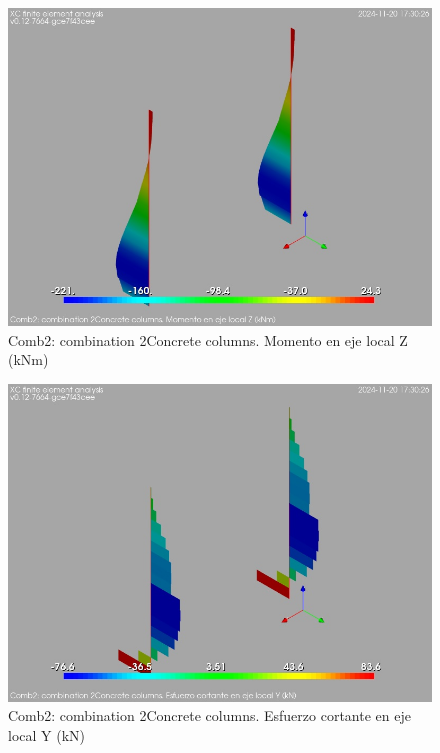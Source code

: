 \begin{figure}[ht]
\begin{center}
\includegraphics[width=\linewidth]{results/graphics/resSimplLC/LS2columnZconcrMz.png}
\caption{Comb2: combination 2Concrete columns. Momento en eje local Z (kNm)}
\label{LS2columnZconcrMz}
\end{center}
\end{figure}
\begin{figure}[ht]
\begin{center}
\includegraphics[width=\linewidth]{results/graphics/resSimplLC/LS2columnZconcrVy.png}
\caption{Comb2: combination 2Concrete columns. Esfuerzo cortante en eje local Y (kN)}
\label{LS2columnZconcrVy}
\end{center}
\end{figure}
\clearpage 
